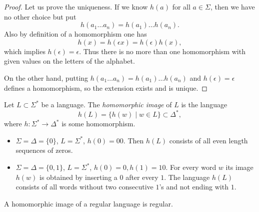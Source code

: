 \begin{page}

\begin{proof}
Let us prove the uniqueness.
If we know $h(a)$ for all $a \in \Sigma$, then we have no other choice but put
\[
h(a_1 \ldots a_n) = h(a_1) \ldots h(a_n).
\]
Also by definition of a homomorphism one has
\[
h(x) = h(\epsilon x) = h(\epsilon) h(x),
\]
which implies $h(\epsilon) = \epsilon$.
Thus there is no more than one homomorphism with given values on the letters of the alphabet.

On the other hand, putting $h(a_1 \ldots a_n) = h(a_1) \ldots h(a_n)$ and $h(\epsilon) = \epsilon$ defines a homomorphism,
so the extension exists and is unique.
\end{proof}


\end{page}

\begin{page}

\begin{dfn}
Let $L \subset \Sigma^*$ be a language. The \emph{homomorphic image} of $L$ is the language
\[
h(L) = \{h(w) \mid w \in L\} \subset \Delta^*,
\]
where $h \colon \Sigma^* \to \Delta^*$ is some homomorphism.
\end{dfn}

\end{page}

\begin{page}

\begin{exl}
\begin{itemize}
\item
$\Sigma = \Delta = \{0\}$, $L = \Sigma^*$, $h(0) = 00$. Then $h(L)$ consists of all even length sequences of zeros.
\item
$\Sigma = \Delta = \{0, 1\}$, $L = \Sigma^*$, $h(0) = 0, h(1) = 10$. For every word $w$ its image $h(w)$ is obtained by inserting a $0$ after every $1$.
The language $h(L)$ consists of all words without two consecutive $1$'s and not ending with $1$.
\end{itemize}
\end{exl}

\end{page}

\begin{page}

\begin{thm}
A homomorphic image of a regular language is regular.
\end{thm}

\end{page}

